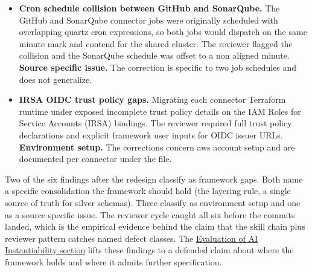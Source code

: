 \begin{itemize}
    \item \textbf{Cron schedule collision between GitHub and SonarQube.} The GitHub and SonarQube connector jobs were originally scheduled with overlapping quartz cron expressions, so both jobs would dispatch on the same minute mark and contend for the shared cluster. The reviewer flagged the collision and the SonarQube schedule was offset to a non aligned minute. \textbf{Source specific issue.} The correction is specific to two job schedules and does not generalize.

    \item \textbf{IRSA OIDC trust policy gaps.} Migrating each connector Terraform runtime under  exposed incomplete trust policy details on the IAM Roles for Service Accounts (IRSA) bindings. The reviewer required full trust policy declarations and explicit framework user inputs for OIDC issuer URLs. \textbf{Environment setup.} The corrections concern \gls{aws} account setup and are documented per connector under the  file.
\end{itemize}

Two of the six findings after the redesign classify as framework gaps. Both name a specific consolidation the framework should hold (the layering rule, a single source of truth for silver schemas). Three classify as environment setup and one as a source specific issue. The reviewer cycle caught all six before the commits landed, which is the empirical evidence behind the claim that the skill chain plus reviewer pattern catches named defect classes. The \hyperref[sec:ai-eval]{Evaluation of AI Instantiability section} lifts these findings to a defended claim about where the framework holds and where it admits further specification.

